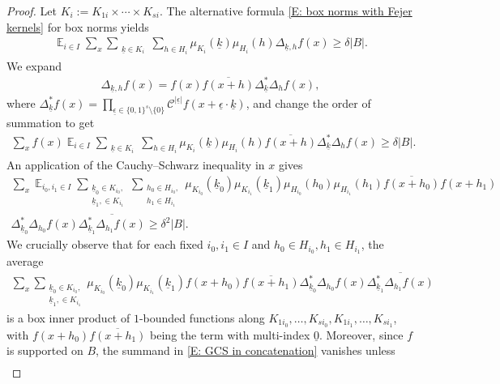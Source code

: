\documentclass[11pt]{amsart}
\theoremstyle{definition}
\DeclareMathOperator*{\E}{\mathbb{E}}
\newcommand{\CC}{{\mathcal C}}
\newcommand{\uk}{{\underline{k}}}
\newcommand{\ueps}{{\underline{\epsilon}}}
\begin{document}
\begin{proof}
Let $K_i:=K_{1i}\times \cdots \times K_{si}$.
    The alternative formula \eqref{E: box norms with Fejer kernels} for box norms yields
    \begin{align*}
        \E_{i\in I} \sum_x \sum_{\substack{\uk \in K_i}}\sum_{h\in H_i}\mu_{K_i}(\uk) \mu_{H_i}(h) \Delta_{\uk, h}f(x) \geq \delta |B|.
    \end{align*}
    We expand
    \begin{align*}
        \Delta_{\uk, h} f(x) = f(x) \overline{f(x+h)} \Delta_{\uk}^*\Delta_{h} f(x), 
    \end{align*}
    where $\Delta_{\uk}^* f(x) = \prod_{\ueps\in\{0,1\}^s\setminus\{0\}}\CC^{|\ueps|}f(x+\ueps\cdot\uk)$,
    and change 
    the order of summation to get
    \begin{align*}
        \sum_{x} f(x) \E_{i\in I} \sum_{\substack{\uk \in K_i}}\sum_{h\in H_i}\mu_{K_i}(\uk) \mu_{H_i}(h) \overline{f(x+h)} \Delta^*_{\uk}\Delta_{h} f(x)\geq \delta |B|.
    \end{align*}
    An application of the Cauchy--Schwarz inequality in $x$ gives
    \begin{align*}
        \sum_x \E_{i_0, i_1\in I} \sum_{\substack{\uk_0\in K_{i_0},\\ \uk_1,\in K_{i_1}}}\sum_{\substack{h_0\in H_{i_0},\\ h_1\in H_{i_1}}}  \mu_{K_{i_0}}(\uk_0) \mu_{K_{i_1}}(\uk_1) \mu_{H_{i_0}}(h_0) \mu_{H_{i_1}}(h_1)
        \overline{f(x+h_0)}f(x+h_1)\\
        \Delta^*_{\uk_0}\Delta_{h_0} f(x)\overline{\Delta^*_{\uk_1}\Delta_{h_1} f(x)}\geq \delta^2 |B|.
    \end{align*}
    We crucially observe that for each fixed $i_0,i_1\in I$ and $h_0\in H_{i_0}, h_1\in H_{i_1}$, the average
    \begin{align}\label{E: GCS in concatenation}
        \sum_x \sum_{\substack{\uk_0\in K_{i_0},\\ \uk_1,\in K_{i_1}}}\mu_{K_{i_0}}(\uk_0) \mu_{K_{i_1}}(\uk_1)
        f(x+h_0)\overline{f(x+h_1)}
        \Delta^*_{\uk_0}\Delta_{h_0} f(x)\overline{\Delta^*_{\uk_1}\Delta_{h_1} f(x)}
    \end{align}
    is a box inner product of $1$-bounded functions along $K_{1i_0}, \ldots, K_{si_0}, K_{1i_1}, \ldots, K_{si_1}$, with $f(x+h_0)\overline{f(x+h_1)}$ being the term with multi-index $\underline{0}$. Moreover, since $f$ is supported on $B$, the summand in \eqref{E: GCS in concatenation} vanishes unless
    \begin{align*}

\end{align*}
\end{proof}
\end{document}
